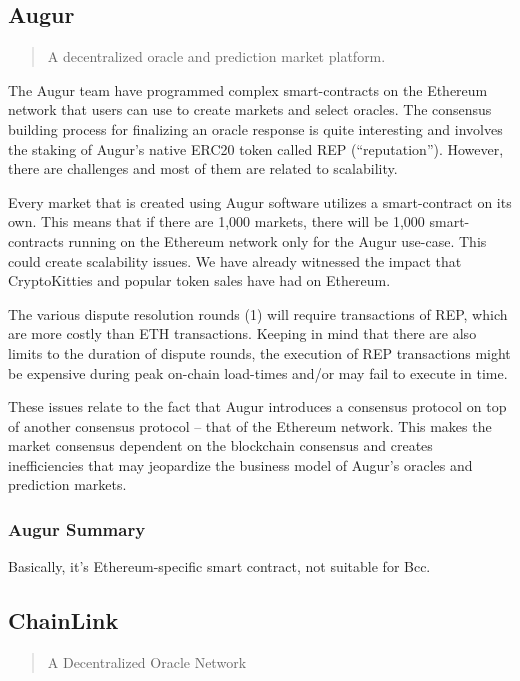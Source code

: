\documentclass{article}
\begin{document}
\subsection{Augur}

\begin{quote}
    A decentralized oracle and prediction market platform.
\end{quote}

The Augur team have programmed complex smart-contracts on the Ethereum network
that users can use to create markets and select oracles.
The consensus building process for finalizing an oracle response is quite interesting
and involves the staking of Augur’s native ERC20 token called REP (“reputation”).
However, there are challenges and most of them are related to scalability.

Every market that is created using Augur software utilizes a smart-contract on its own.
This means that if there are 1,000 markets, there will be 1,000 smart-contracts
running on the Ethereum network only for the Augur use-case.
This could create scalability issues.
We have already witnessed the impact that CryptoKitties and popular token sales
have had on Ethereum.

The various dispute resolution rounds (1) will require transactions of REP,
which are more costly than ETH transactions.
Keeping in mind that there are also limits to the duration of dispute rounds,
the execution of REP transactions might be expensive during peak on-chain load-times
and/or may fail to execute in time.

These issues relate to the fact that Augur introduces a consensus protocol
on top of another consensus protocol – that of the Ethereum network.
This makes the market consensus dependent on the blockchain consensus
and creates inefficiencies that may jeopardize the business model of Augur’s oracles
and prediction markets.

\subsubsection{Augur Summary}

Basically, it's Ethereum-specific smart contract, not suitable for Bcc.

\subsection{ChainLink}

\begin{quote}
A Decentralized Oracle Network
\end{quote}
\end{document}
